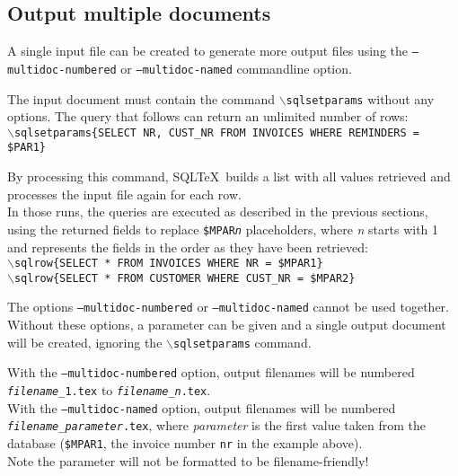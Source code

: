 \documentclass{article}
\newcommand{\bs}{\ensuremath{\backslash}}
\newcommand{\vs}{\vspace{3mm}}
\begin{document}
\subsection{Output multiple documents}\label{multidoc}

A single input file can be created to generate more output files using the \texttt{--multidoc-numbered} or \texttt{--multidoc-named} commandline option.

The input document must contain the command \texttt{\bs sqlsetparams} without any options. The query that follows can return an unlimited number of rows: \\
\texttt{\bs sqlsetparams\{SELECT NR, CUST\_NR FROM INVOICES WHERE REMINDERS = \$PAR1\}}

\vs

By processing this command, SQL\TeX\ builds a list with all values retrieved and
processes the input file again for each row.\\
In those runs, the queries are executed as described in the previous sections,
using the returned fields to replace \texttt{\$MPAR\textit{n}} placeholders, where \textit{n} starts with 1 and represents the fields in the order as they have been retrieved:\\
\texttt{\bs sqlrow\{SELECT * FROM INVOICES WHERE NR = \$MPAR1\}} \\
\texttt{\bs sqlrow\{SELECT * FROM CUSTOMER WHERE CUST\_NR = \$MPAR2\}}

\vs

The options \texttt{--multidoc-numbered} or \texttt{--multidoc-named} cannot be used together.\\
Without these options, a parameter can be given and a single output
document will be created, ignoring the \texttt{\bs sqlsetparams} command.

\vs

With the \texttt{--multidoc-numbered} option, output filenames will be numbered \texttt{\emph{filename}\_1.tex} to \texttt{\emph{filename}\_\emph{n}.tex}.\\
With the \texttt{--multidoc-named} option, output filenames will be numbered \\\texttt{\emph{filename}\_\emph{parameter}.tex}, where \emph{parameter} is the first value taken from the database (\texttt{\$MPAR1}, the invoice number \texttt{nr} in the example above). \\
Note the parameter will not be formatted to be filename-friendly!\\
\end{document}
